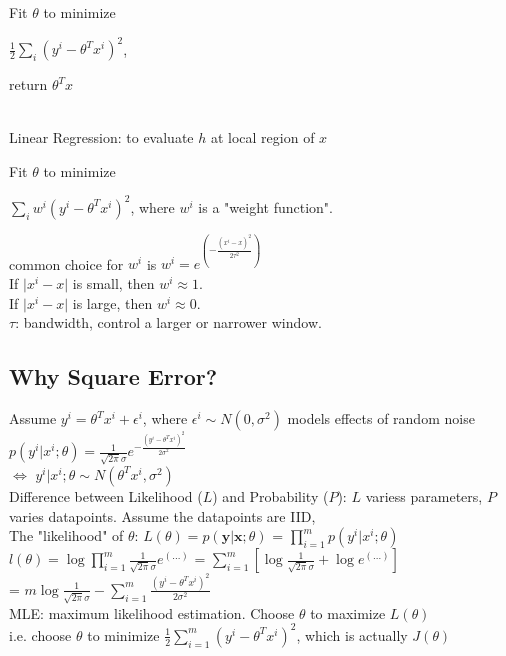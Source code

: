 \documentclass{article}
\begin{document}
\noindent
Fit $\theta$ to minimize

$\frac{1}{2}\sum\limits_{i}(y^i-\theta^Tx^i)^2$, 

\noindent
return $\theta^Tx$


~\\
\noindent
Linear Regression: to evaluate $h$ at local region of $x$

\noindent
Fit $\theta$ to minimize

$\sum\limits_{i}w^i(y^i-\theta^Tx^i)^2$, 
where $w^i$ is a "weight function".

\noindent
common choice for $w^i$ is $w^i = e^{(-\frac{(x^i-x)^2}{2\tau^2})}$\\
If $\lvert x^i-x \rvert$ is small, then $w^i \approx 1$.\\
If $\lvert x^i-x \rvert$ is large, then $w^i \approx 0$.\\
$\tau$: bandwidth, control a larger or narrower window.

\subsection{Why Square Error?}

Assume $y^i = \theta^Tx^i + \epsilon^i$, where $\epsilon^i \sim  N(0, \sigma^2)$ models effects of random noise\\
$p(y^i|x^i;\theta) = \frac{1}{\sqrt{2\pi}\sigma}e^{-\frac{(y^i-\theta^Tx^i)^2}{2\sigma^2}}$\\
$\iff$ $y^i|x^i;\theta \sim N(\theta^Tx^i, \sigma^2)$\\

\noindent
Difference between Likelihood ($L$) and Probability ($P$): $L$ variess parameters, $P$ varies datapoints.
Assume the datapoints are IID,\\
The "likelihood" of $\theta$: $L(\theta) = p(\boldsymbol{y}|\boldsymbol{x};\theta)$
= $\prod\limits_{i=1}^m p(y^i|x^i;\theta)$\\
$l(\theta) = \log{\prod\limits_{i=1}^m\frac{1}{\sqrt{2\pi}\sigma}e^{(...)}}$
= $\sum\limits_{i=1}^m[\log{\frac{1}{\sqrt{2\pi}\sigma}} + \log{e^{(...)}}]$\\
= $m\log{\frac{1}{\sqrt{2\pi}\sigma}} - \sum\limits_{i=1}^m\frac{(y^i-\theta^Tx^i)^2}{2\sigma^2}$\\

\noindent
MLE: maximum likelihood estimation. Choose $\theta$ to maximize $L(\theta)$\\
i.e. choose $\theta$ to minimize $\frac{1}{2}\sum\limits_{i=1}^m(y^i-\theta^Tx^i)^2$, which is actually $J(\theta)$
\end{document}
